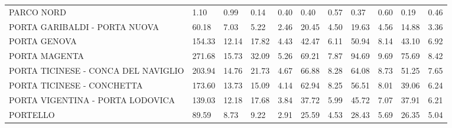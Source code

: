 \begin{table}[H]
{{\begin{tabular}{lp{1.3cm}p{1.3cm}p{1.3cm}p{1.3cm}p{1.3cm}p{1.3cm}p{1.3cm}p{1.3cm}p{1.3cm}p{1.3cm}}
PARCO NORD                                         &                      1.10 &                  0.99 &                        0.14 &                    0.40 &                        0.40 &                    0.57 &                        0.37 &                    0.60 &                      0.19 &                  0.46 \\
PORTA GARIBALDI - PORTA NUOVA                      &                     60.18 &                  7.03 &                        5.22 &                    2.46 &                       20.45 &                    4.50 &                       19.63 &                    4.56 &                     14.88 &                  3.36 \\
PORTA GENOVA                                       &                    154.33 &                 12.14 &                       17.82 &                    4.43 &                       42.47 &                    6.11 &                       50.94 &                    8.14 &                     43.10 &                  6.92 \\
PORTA MAGENTA                                      &                    271.68 &                 15.73 &                       32.09 &                    5.26 &                       69.21 &                    7.87 &                       94.69 &                    9.69 &                     75.69 &                  8.42 \\
PORTA TICINESE - CONCA DEL NAVIGLIO                &                    203.94 &                 14.76 &                       21.73 &                    4.67 &                       66.88 &                    8.28 &                       64.08 &                    8.73 &                     51.25 &                  7.65 \\
PORTA TICINESE - CONCHETTA                         &                    173.60 &                 13.73 &                       15.09 &                    4.14 &                       62.94 &                    8.25 &                       56.51 &                    8.01 &                     39.06 &                  6.24 \\
PORTA VIGENTINA - PORTA LODOVICA                   &                    139.03 &                 12.18 &                       17.68 &                    3.84 &                       37.72 &                    5.99 &                       45.72 &                    7.07 &                     37.91 &                  6.21 \\
PORTELLO                                           &                     89.59 &                  8.73 &                        9.22 &                    2.91 &                       25.59 &                    4.53 &                       28.43 &                    5.69 &                     26.35 &                  5.04 \\

\end{tabular}}}
\end{table}
